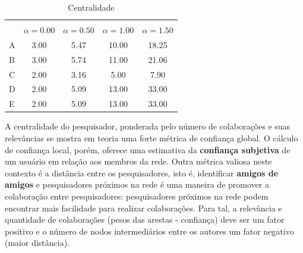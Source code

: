 \documentclass[12pt]{article}
\begin{document}
  \begin{table}[ht]
    \caption{Centralidade}
    \label{tab:centrality}
    \centering
    \begin{tabular}{|lcccc|}
      \hline
      \rowcolor[HTML]{343434} 
      \multicolumn{1}{|c}{\cellcolor[HTML]{343434}{\color[HTML]{FFFFFF} }}                       & \multicolumn{4}{c|}{\cellcolor[HTML]{343434}{\color[HTML]{FFFFFF} $C_D ^{w \alpha} (i)$}}                                              \\
      \rowcolor[HTML]{656565} 
      \multicolumn{1}{|c}{\multirow{-2}{*}{\cellcolor[HTML]{343434}{\color[HTML]{FFFFFF} Nodo}}} & {\color[HTML]{FFFFFF} $\alpha = 0.00$} & {\color[HTML]{FFFFFF} $\alpha = 0.50$} & {\color[HTML]{FFFFFF} $\alpha = 1.00$} & {\color[HTML]{FFFFFF} $\alpha = 1.50$} \\
      \multicolumn{1}{|l|}{A}                                                                    & 3.00                        & 5.47                        & 10.00                       & 18.25                       \\
      \multicolumn{1}{|l|}{B}                                                                    & 3.00                        & 5.74                        & 11.00                       & 21.06                       \\
      \multicolumn{1}{|l|}{C}                                                                    & 2.00                        & 3.16                        & 5.00                        & 7.90                        \\
      \multicolumn{1}{|l|}{D}                                                                    & 2.00                        & 5.09                        & 13.00                       & 33.00                       \\
      \multicolumn{1}{|l|}{E}                                                                    & 2.00                        & 5.09                        & 13.00                       & 33.00                       \\ \hline
    \end{tabular}
  \end{table}  


A centralidade do pesquisador, ponderada pelo número de colaborações e suas relevâncias se mostra em teoria uma forte métrica de 
confiança global. O cálculo de confiança local, porém, oferece uma estimativa da \textbf{confiança subjetiva} de um usuário em 
relação aos membros da rede. Outra métrica valiosa neste contexto é a distância entre os pesquisadores, isto é, identificar 
\textbf{amigos de amigos} e pesquisadores próximos na rede é uma maneira de promover a colaboração entre pesquisadores: 
pesquisadores próximos na rede podem encontrar mais facilidade para realizar colaborações. Para tal, a relevância e quantidade de 
colaborações (pesos das arestas - confiança) deve ser um fator positivo e o número de nodos intermediários entre os autores um 
fator negativo (maior distância).
\end{document}
